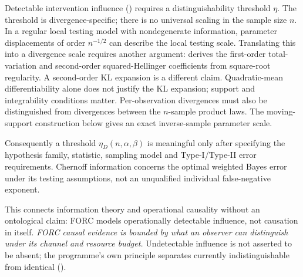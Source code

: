 Detectable intervention influence ()
requires a distinguishability threshold $\eta$.  The threshold is
divergence-specific; there is no universal scaling in the sample size
$n$. In a regular local testing model with nondegenerate information,
parameter displacements of order $n^{-1/2}$ can describe the local
testing scale. Translating this into a divergence scale requires another
argument:  derives the first-order
total-variation and second-order squared-Hellinger coefficients from
square-root regularity. A second-order KL expansion is a different claim.
Quadratic-mean differentiability alone does not
justify the KL expansion; support and integrability conditions matter.
Per-observation divergences must also be distinguished from divergences
between the $n$-sample product laws. The moving-support construction
below gives an exact inverse-sample parameter scale.

Consequently a threshold $\eta_D(n,\alpha,\beta)$ is meaningful only
after specifying the hypothesis family, statistic, sampling model and
Type-I/Type-II error requirements. Chernoff information concerns the
optimal weighted Bayes error under its testing assumptions, not an
unqualified individual false-negative exponent.

This connects information theory and operational causality without an
ontological claim: FORC models operationally detectable influence, not
causation in itself.  \emph{FORC causal evidence is bounded by what an
observer can distinguish under its channel and resource budget.}
Undetectable influence is not asserted to be absent; the programme's
own principle separates currently indistinguishable from identical
().




